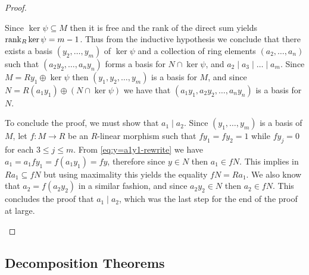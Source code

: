 \begin{proof}
\begin{enumerate}[(a)]
              Since \(\ker \psi \subseteq M\) then it is free and the rank of the direct sum
              yields \(\operatorname{rank}_R \ker \psi = m - 1\). Thus from the inductive hypothesis we
              conclude that there exists a basis \((y_2, \dots, y_m)\) of \(\ker \psi\) and
              a collection of ring elements \((a_2, \dots, a_n)\) such that
              \((a_2 y_2, \dots, a_n y_n)\) forms a basis for \(N \cap \ker \psi\), and
              \(a_2 \mid a_3 \mid \dots \mid a_m\). Since \(M = R y_1 \oplus \ker \psi\)
              then \((y_1, y_2, \dots, y_m)\) is a basis for \(M\), and since \(N = R (a_1
              y_1) \oplus (N \cap \ker \psi)\) we have that \((a_1 y_1, a_2 y_2, \dots, a_n
              y_n)\) is a basis for \(N\).

              To conclude the proof, we must show that \(a_1 \mid a_2\). Since
              \((y_1, \dots, y_m)\) is a basis of \(M\), let \(f: M \to R\) be an
              \(R\)-linear morphism such that \(f y_1 = f y_2 = 1\) while \(f y_j = 0\) for
              each \(3 \leq j \leq m\). From \cref{eq:y=a1y1-rewrite} we have
              \(a_1 = a_1 f y_1 = f(a_1 y_1) = f y\), therefore since \(y \in N\) then \(a_1
              \in f N\). This implies in \(R a_1 \subseteq f N\) but using maximality this
              yields the equality \(f N = R a_1\). We also know that \(a_2 = f(a_2 y_2)\) in
              a similar fashion, and since \(a_2 y_2 \in N\) then \(a_2 \in f N\). This
              concludes the proof that \(a_1 \mid a_2\), which was the last step for the end
              of the proof at large.
    \end{enumerate}
\end{proof}

\subsection{Decomposition Theorems}

